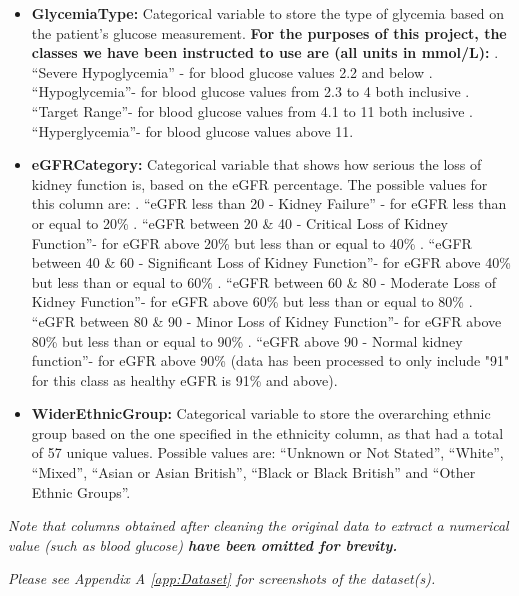{\begin{itemize}
        \item \textbf{Glycemia\textunderscore Type:} Categorical variable to store the type of glycemia based on the patient's glucose measurement. \textbf{For the purposes of this project, the classes we have been instructed to use are (all units in mmol/L):} . ``Severe Hypoglycemia'' - for blood glucose values 2.2 and below . ``Hypoglycemia''- for blood glucose values from 2.3 to 4 both inclusive . ``Target Range''- for blood glucose values from 4.1 to 11 both inclusive . ``Hyperglycemia''- for blood glucose values above 11. 

        \item \textbf{eGFR\textunderscore Category:} Categorical variable that shows how serious the loss of kidney function is, based on the eGFR percentage. The possible values for this column are: . ``eGFR less than 20 - Kidney Failure'' - for eGFR less than or equal to 20\% . ``eGFR between 20 \& 40 - Critical Loss of Kidney Function''- for eGFR above 20\% but less than or equal to 40\% . ``eGFR between 40 \& 60 - Significant Loss of Kidney Function''- for eGFR above 40\% but less than or equal to 60\% . ``eGFR between 60 \& 80 - Moderate Loss of Kidney Function''- for eGFR above 60\% but less than or equal to 80\% . ``eGFR between 80 \& 90 - Minor Loss of Kidney Function''- for eGFR above 80\% but less than or equal to 90\% . ``eGFR above 90 - Normal kidney function''- for eGFR above 90\% (data has been processed to only include "91" for this class as healthy eGFR is 91\% and above). 

        \item \textbf{Wider\textunderscore Ethnic\textunderscore Group:} Categorical variable to store the overarching ethnic group based on the one specified in the ethnicity column, as that had a total of 57 unique values. Possible values are: ``Unknown or Not Stated'', ``White'', ``Mixed'', ``Asian or Asian British'', ``Black or Black British'' and ``Other Ethnic Groups''.

    \end{itemize}

    \vspace{10pt}
    \noindent \textit{Note that columns obtained after cleaning the original data to extract a numerical value (such as blood glucose) \textbf{ have been omitted for brevity.}}

    \vspace{10pt}
    \noindent \textit{Please see Appendix A \space \autoref{app:Dataset} for screenshots of the dataset(s).}

}

